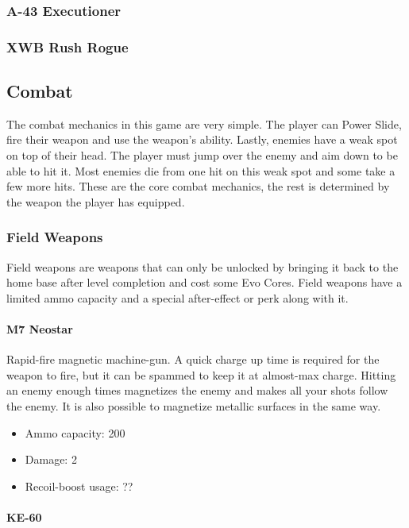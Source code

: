 \documentclass[12pt]{article}
\begin{document}
\subsubsection{A-43 Executioner}

\subsubsection{XWB Rush Rogue}

\subsection{Combat}

The combat mechanics in this game are very simple. The player can Power Slide, fire their weapon and use the weapon's ability. Lastly, enemies have a weak spot on top of their head. The player must jump over the enemy and aim down to be able to hit it. Most enemies die from one hit on this weak spot and some take a few more hits. 
These are the core combat mechanics, the rest is determined by the weapon the player has equipped.

\subsubsection{Field Weapons}

Field weapons are weapons that can only be unlocked by bringing it back to the home base after level completion and cost some Evo Cores. Field weapons have a limited ammo capacity and a special after-effect or perk along with it.

\paragraph{M7 Neostar}

Rapid-fire magnetic machine-gun. A quick charge up time is required for the weapon to fire, but it can be spammed to keep it at almost-max charge. Hitting an enemy enough times magnetizes the enemy and makes all your shots follow the enemy. It is also possible to magnetize metallic surfaces in the same way.

\begin{itemize}
	\item Ammo capacity: 200
	\item Damage: 2
	\item Recoil-boost usage: ??
\end{itemize}


\paragraph{KE-60}
\end{document}
